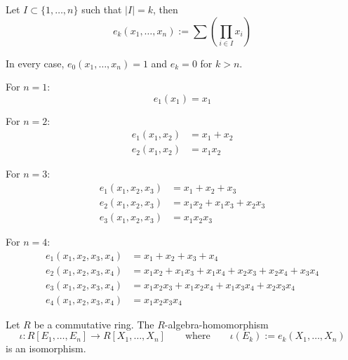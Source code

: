\begin{definition}
   Let \(I \subset \{1, \ldots, n\}\) such that \(\lvert I\rvert = k\), then
   \[e_k(x_1, \ldots, x_n) := \sum\left(\prod_{i \in I} x_i\right)\]
\end{definition}
\begin{example}
   In every case, \(e_0(x_1, \ldots, x_n) = 1\) and \(e_k = 0\) for \(k > n\).

   For \(n = 1\):
   \[e_1(x_1) = x_1\]

   For \(n = 2\):
   \begin{equation*}
      \begin{split}
         e_1(x_1,x_2) &= x_1 + x_2\\
         e_2(x_1,x_2) &= x_1 x_2
      \end{split}
   \end{equation*}

   For \(n = 3\):
   \begin{equation*}
      \begin{split}
         e_1(x_1, x_2, x_3) &= x_1 + x_2 + x_3\\
         e_2(x_1, x_2, x_3) &= x_1x_2 + x_1x_3 + x_2x_3\\
         e_3(x_1, x_2, x_3) &= x_1x_2x_3
      \end{split}
   \end{equation*}

   For \(n = 4\):
   \begin{equation*}
      \begin{split}
         e_1(x_1, x_2, x_3, x_4) &= x_1 + x_2 + x_3 + x_4\\
         e_2(x_1, x_2, x_3, x_4) &= x_1x_2 + x_1x_3 + x_1x_4 + x_2x_3 + x_2x_4 + x_3x_4\\
         e_3(x_1, x_2, x_3, x_4) &= x_1x_2x_3 + x_1x_2x_4 + x_1x_3x_4 + x_2x_3x_4\\
         e_4(x_1, x_2, x_3, x_4) &= x_1x_2x_3x_4
      \end{split}
   \end{equation*}
\end{example}

\begin{proposition}
   Let \(R\) be a commutative ring.
   The \(R\)-algebra-homomorphism
   \[\iota: R[E_1, \ldots, E_n] \to R[X_1, \ldots, X_n] \qquad\text{where}\qquad \iota(E_k) := e_k(X_1, \ldots, X_n)\]
   is an isomorphism.
\end{proposition}

